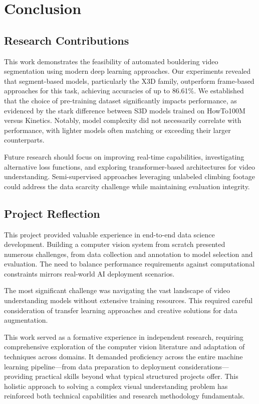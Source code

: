 \section{Conclusion}

\subsection*{Research Contributions}
This work demonstrates the feasibility of automated bouldering video segmentation using modern deep learning approaches. Our experiments revealed that segment-based models, particularly the X3D family, outperform frame-based approaches for this task, achieving accuracies of up to 86.61\%. We established that the choice of pre-training dataset significantly impacts performance, as evidenced by the stark difference between S3D models trained on HowTo100M versus Kinetics. Notably, model complexity did not necessarily correlate with performance, with lighter models often matching or exceeding their larger counterparts.

Future research should focus on improving real-time capabilities, investigating alternative loss functions, and exploring transformer-based architectures for video understanding. Semi-supervised approaches leveraging unlabeled climbing footage could address the data scarcity challenge while maintaining evaluation integrity.

\subsection*{Project Reflection}
This project provided valuable experience in end-to-end data science development. Building a computer vision system from scratch presented numerous challenges, from data collection and annotation to model selection and evaluation. The need to balance performance requirements against computational constraints mirrors real-world AI deployment scenarios.

The most significant challenge was navigating the vast landscape of video understanding models without extensive training resources. This required careful consideration of transfer learning approaches and creative solutions for data augmentation.

This work served as a formative experience in independent research, requiring comprehensive exploration of the computer vision literature and adaptation of techniques across domains. It demanded proficiency across the entire machine learning pipeline—from data preparation to deployment considerations—providing practical skills beyond what typical structured projects offer. This holistic approach to solving a complex visual understanding problem has reinforced both technical capabilities and research methodology fundamentals.